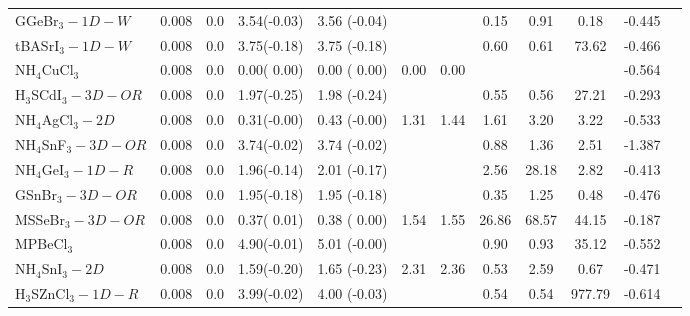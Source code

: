\begin{table*}
\begin{tabular*}{0.98\textwidth}{@{\extracolsep{\fill}}l c c c c c c c c c c c}
      GGeBr$_3-1D-W$&      0.008&        0.0&       3.54(-0.03)&            3.56  (-0.04)&           &                &            0.15&            0.91&            0.18&     -0.445\\
     tBASrI$_3-1D-W$&      0.008&        0.0&       3.75(-0.18)&            3.75  (-0.18)&           &                &            0.60&            0.61&           73.62&     -0.466\\
      NH$_4$CuCl$_3$&      0.008&        0.0&       0.00( 0.00)&            0.00  ( 0.00)&       0.00&            0.00&                &                &                &     -0.564\\
 H$_3$SCdI$_3-3D-OR$&      0.008&        0.0&       1.97(-0.25)&            1.98  (-0.24)&           &                &            0.55&            0.56&           27.21&     -0.293\\
   NH$_4$AgCl$_3-2D$&      0.008&        0.0&       0.31(-0.00)&            0.43  (-0.00)&       1.31&            1.44&            1.61&            3.20&            3.22&     -0.533\\
 NH$_4$SnF$_3-3D-OR$&      0.008&        0.0&       3.74(-0.02)&            3.74  (-0.02)&           &                &            0.88&            1.36&            2.51&     -1.387\\
  NH$_4$GeI$_3-1D-R$&      0.008&        0.0&       1.96(-0.14)&            2.01  (-0.17)&           &                &            2.56&           28.18&            2.82&     -0.413\\
     GSnBr$_3-3D-OR$&      0.008&        0.0&       1.95(-0.18)&            1.95  (-0.18)&           &                &            0.35&            1.25&            0.48&     -0.476\\
    MSSeBr$_3-3D-OR$&      0.008&        0.0&       0.37( 0.01)&            0.38  ( 0.00)&       1.54&            1.55&           26.86&           68.57&           44.15&     -0.187\\
          MPBeCl$_3$&      0.008&        0.0&       4.90(-0.01)&            5.01  (-0.00)&           &                &            0.90&            0.93&           35.12&     -0.552\\
    NH$_4$SnI$_3-2D$&      0.008&        0.0&       1.59(-0.20)&            1.65  (-0.23)&       2.31&            2.36&            0.53&            2.59&            0.67&     -0.471\\
 H$_3$SZnCl$_3-1D-R$&      0.008&        0.0&       3.99(-0.02)&            4.00  (-0.03)&           &                &            0.54&            0.54&          977.79&     -0.614\\
   \hline 
    \end{tabular*}
 \end{table*}
